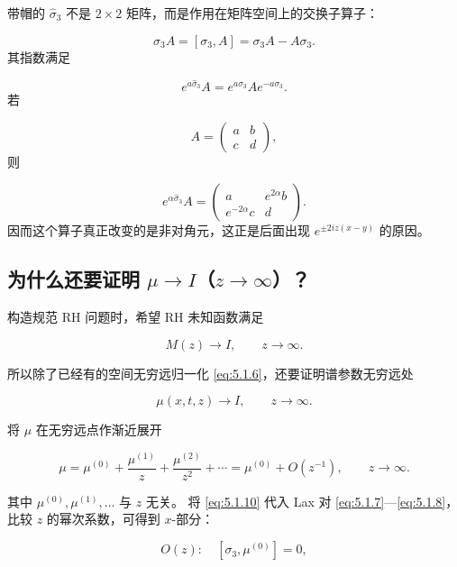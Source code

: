 \documentclass[
    lang=cn,
    scheme=chinese,
    mode=simple,
    device=normal,
    color=blue,
    math=cm,
    thmcnt=section,
    12pt
]{elegantbook}
\begin{document}
\begin{callout}
    带帽的 $\widehat{\sigma}_3$ 不是 $2\times2$ 矩阵，而是作用在矩阵空间上的交换子算子：

    \[
        \widehat{\sigma}_3A=[\sigma_3,A]=\sigma_3A-A\sigma_3.
    \]
    其指数满足

    \[
        e^{a\widehat{\sigma}_3}A
        =
        e^{a\sigma_3}Ae^{-a\sigma_3}.
    \]
    若

    \[
        A=\begin{pmatrix}a&b\\c&d\end{pmatrix},
    \]
    则

    \[
        e^{\alpha\widehat{\sigma}_3}A
        =
        \begin{pmatrix}
            a             & e^{2\alpha}b \\
            e^{-2\alpha}c & d
        \end{pmatrix}.
    \]
    因而这个算子真正改变的是非对角元，这正是后面出现 $e^{\pm2iz(x-y)}$ 的原因。
\end{callout}

\subsection{为什么还要证明 \texorpdfstring{$\mu\to I$}{μ → I}（\texorpdfstring{$z\to\infty$}{z → ∞}）？}

构造规范 RH 问题时，希望 RH 未知函数满足

\[
    M(z)\to I,\qquad z\to\infty.
\]

所以除了已经有的空间无穷远归一化 \eqref{eq:5.1.6}，还要证明谱参数无穷远处

\[
    \mu(x,t,z)\to I,\qquad z\to\infty.
\]

将 $\mu$ 在无穷远点作渐近展开

\begin{equation}
    \mu
    =
    \mu^{(0)}
    +\dfrac{\mu^{(1)}}{z}
    +\dfrac{\mu^{(2)}}{z^2}
    +\cdots
    =
    \mu^{(0)}+O(z^{-1}),
    \qquad z\to\infty.
    \tag{5.1.10}
    \label{eq:5.1.10}
\end{equation}

其中 $\mu^{(0)},\mu^{(1)},\ldots$ 与 $z$ 无关。
将 \eqref{eq:5.1.10} 代入 Lax 对 \eqref{eq:5.1.7}---\eqref{eq:5.1.8}，比较 $z$ 的幂次系数，可得到 $x$-部分：

\begin{equation}
    O(z):\quad[\sigma_3,\mu^{(0)}]=0,
    \tag{5.1.11}
    \label{eq:5.1.11}
\end{equation}
\end{document}
